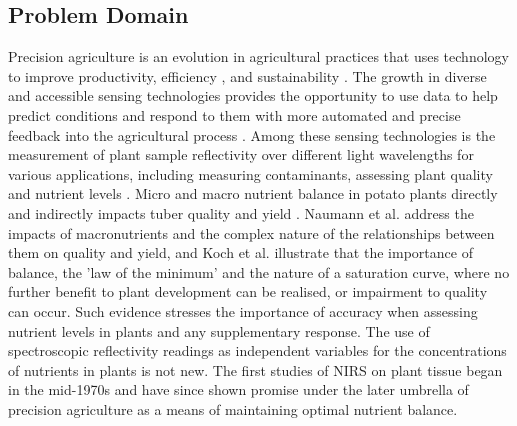 \documentclass[conference]{IEEEtran}
\begin{document}
\subsection{Problem Domain}
Precision agriculture is an evolution in agricultural practices that uses technology to improve productivity, efficiency \cite{GAO-24-105962}, and sustainability \cite{Bongiovanni2004}. The growth in diverse and accessible sensing technologies provides the opportunity to use data to help predict conditions and respond to them with more automated and precise feedback into the agricultural process \cite{Herrmann2021}. Among these sensing technologies is the measurement of plant sample reflectivity over different light wavelengths for various applications, including measuring contaminants, assessing plant quality and nutrient levels \cite{Workman2024}. Micro and macro nutrient balance in potato plants directly and indirectly impacts tuber quality and yield \cite{Oivukkamaeki2023}. Naumann et al. \cite{Naumann2020} address the impacts of macronutrients and the complex nature of the relationships between them on quality and yield, and Koch et al. \cite{Koch2020} illustrate that the importance of balance, the 'law of the minimum' and the nature of a saturation curve, where no further benefit to plant development can be realised, or impairment to quality can occur. Such evidence stresses the importance of accuracy when assessing nutrient levels in plants and any supplementary response. The use of spectroscopic reflectivity readings as independent variables for the concentrations of nutrients in plants is not new. The first studies of NIRS on plant tissue began in the mid-1970s \cite{Prananto2020} and have since shown promise under the later umbrella of precision agriculture as a means of maintaining optimal nutrient balance. 
\end{document}
